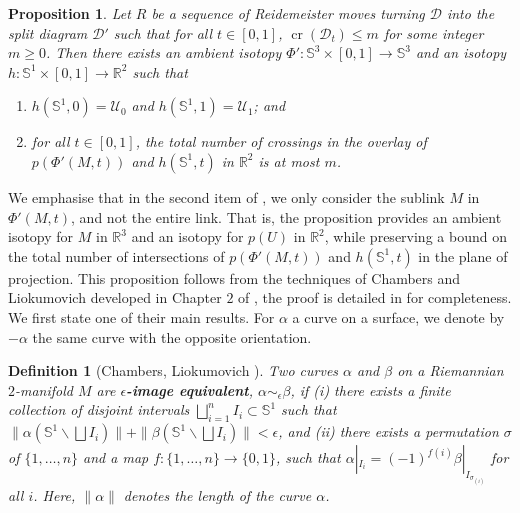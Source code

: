 \documentclass[10pt,a4paper]{amsart}
\newcommand{\R}{\mathbb{R}}
\newcommand{\Sp}{\mathbb{S}}
\newcommand{\cross}{\operatorname{cr}}
\newtheorem{definition}[theorem]{Definition}
\newtheorem{proposition}[theorem]{Proposition}
\begin{document}
\begin{proposition}\label{prop_iso_U}
Let $R$ be a sequence of Reidemeister moves turning $\mathcal{D}$ into the split diagram $\mathcal{D}'$ such that for all $t \in [0,1]$,  $\cross(\mathcal{D}_t)\leq m$ for some integer $m \geq 0$. Then there exists an ambient isotopy $\Phi' : \Sp^3 \times [0,1] \to \Sp^3$ and an isotopy $h:\Sp^1 \times [0,1] \rightarrow \R^2$ such that

\begin{enumerate}
    \item $h(\Sp^1,0)=\mathcal{U}_0$ and $h(\Sp^1,1)=\mathcal{U}_1$; and
    \item for all $t \in [0,1]$, the total number of crossings in the overlay of $p(\Phi'(M,t))$ and $h(\Sp^1,t)$ in $\R^2$ is at most $m$.
\end{enumerate}
\end{proposition}

We emphasise that in the second item of , we only consider the sublink $M$ in $\Phi'(M,t)$, and not the entire link. That is, the proposition provides an ambient isotopy for $M$ in $\R^3$ and an isotopy for $p(U)$ in $\R^2$, while preserving a bound on the total number of intersections of $p(\Phi'(M,t))$ and $h(\Sp^1,t)$ in the plane of projection. This proposition follows from the techniques of Chambers and Liokumovich developed in Chapter $2$ of \cite{Chambers_homo-isotopy}, the proof is detailed in  for completeness. We first state one of their main results. For $\alpha$ a curve on a surface, we denote by $-\alpha$ the same curve with the opposite orientation.

\begin{definition}[Chambers, Liokumovich {\cite[Definition 1.3]{Chambers_homo-isotopy}}]
\label{def:Chambers_homo-isotopy}
Two curves $\alpha$ and $\beta$ on a Riemannian $2$-manifold $M$ are \textbf{$\epsilon$-image equivalent}, $\alpha \sim_\epsilon \beta$, if (i) there exists a finite collection of disjoint intervals $\bigsqcup_{i=1}^{n} I_i \subset \Sp^1$ such that $\|\alpha (\Sp^1 \smallsetminus \bigsqcup I_i)\| + \| \beta (\Sp^1 \smallsetminus \bigsqcup I_i) \| < \epsilon$, and (ii) there exists a permutation $\sigma$ of $\{1, \ldots, n\}$ and a map $f : \{1, \ldots, n\} \rightarrow \{0,1\}$, such that $\alpha |_{I_i} = {(-1)}^{f(i)} \beta|_{I_{\sigma_{(i)}}}$ for all $i$. Here, $\| \alpha \|$ denotes the length of the curve $\alpha$.
\end{definition}
\end{document}
